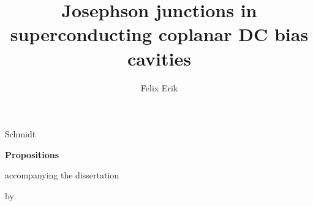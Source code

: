 \documentclass{dissertation-edit}
\begin{document}
\title[Fundamental studies and applications]{Josephson junctions in superconducting coplanar DC bias cavities}
\author{Felix Erik}{Schmidt}

\begin{center}

{\Large\titlefont\bfseries Propositions}

\bigskip

accompanying the dissertation

\bigskip

{\makeatletter
\titlestyle\bfseries\large\@title
\makeatother}

{\makeatletter
\ifx\@subtitle\undefined\else
    \titlefont\titleshape\@subtitle
\fi
\makeatother}

\bigskip

by

\bigskip

\makeatletter
{\large\titlefont\bfseries\@firstname\ {\titleshape\@lastname}}
\makeatother

\end{center}

\bigskip
\bigskip
\end{document}
